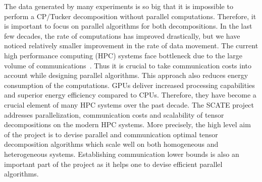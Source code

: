 \documentclass[a4paper,11pt]{article}
\begin{document}
	
	The data generated by many experiments is so big that it is impossible to perform a CP/Tucker decomposition without parallel computations. Therefore, it is important to focus on parallel algorithms for both decompositions.
	In the last few decades, the rate of computations has improved drastically, but we have noticed relatively smaller improvement in the rate of data movement. The current high performance computing (HPC) systems face bottleneck due to the large volume of communications~\cite{DOE-Report-2014}. Thus it is crucial to take communication costs into account while designing parallel algorithms. This approach also reduces energy consumption of the computations. GPUs deliver increased processing capabilities and superior energy efficiency compared to CPUs. Therefore, they have become a crucial element of many HPC systems over the past decade. The SCATE project addresses parallelization, communication costs and scalability of tensor decompositions on the modern HPC systems. More precisely, the high level aim of the project is to devise parallel and communication optimal tensor decomposition algorithms which scale well on both homogeneous and heterogeneous systems. Establishing communication lower bounds is also an important part of the project as it helps one to devise efficient parallel algorithms.
	
	
	
	
	
\end{document}
